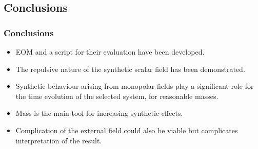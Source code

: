\documentclass[aspectratio=169]{beamer}
\begin{document}
\subsection{Conclusions}
\begin{frame}
        \frametitle{Conclusions}
        \begin{itemize}
                \item EOM and a script for their evaluation have been developed.
                \item The repulsive nature of the synthetic scalar field has been
                        demonstrated.
                \item Synthetic behaviour arising from monopolar fields play a significant
                        role for the time evolution of the selected system, for reasonable
                        masses.
                \item Mass is the main tool for increasing synthetic effects.
                \item Complication of the external field could also be viable but 
                        complicates interpretation of the result.
        \end{itemize}
\end{frame}
\end{document}
